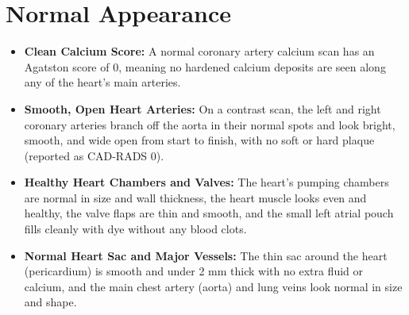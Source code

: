 \section{Normal Appearance}
\begin{itemize}
    \item \textbf{Clean Calcium Score:} A normal coronary artery calcium scan has an Agatston score of 0, meaning no hardened calcium deposits are seen along any of the heart's main arteries.
    \item \textbf{Smooth, Open Heart Arteries:} On a contrast scan, the left and right coronary arteries branch off the aorta in their normal spots and look bright, smooth, and wide open from start to finish, with no soft or hard plaque (reported as CAD-RADS 0).
    \item \textbf{Healthy Heart Chambers and Valves:} The heart's pumping chambers are normal in size and wall thickness, the heart muscle looks even and healthy, the valve flaps are thin and smooth, and the small left atrial pouch fills cleanly with dye without any blood clots.
    \item \textbf{Normal Heart Sac and Major Vessels:} The thin sac around the heart (pericardium) is smooth and under 2 mm thick with no extra fluid or calcium, and the main chest artery (aorta) and lung veins look normal in size and shape.
\end{itemize}

